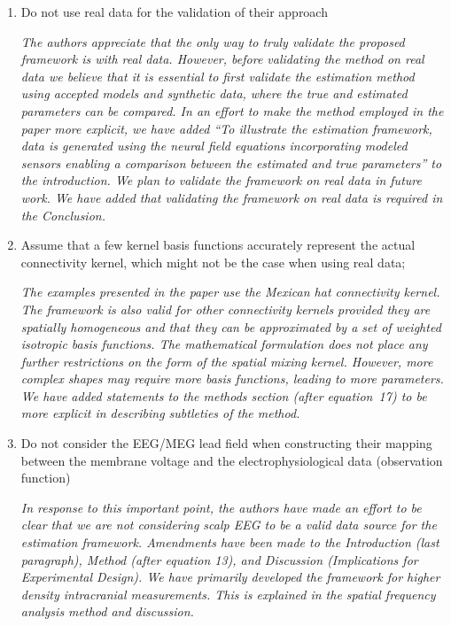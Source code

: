 \documentclass{article}
\begin{document}
    \begin{enumerate}
        \item Do not use real data for the validation of their approach

	\emph{The authors appreciate that the only way to truly validate the proposed framework is with real data. However, before validating the method on real data we believe that it is essential to first validate the estimation method using accepted models and synthetic data, where the true and estimated parameters can be compared. In an effort to make the method employed in the paper more explicit, we have added ``To illustrate the estimation framework, data is generated using the neural field equations incorporating modeled sensors enabling a comparison between the estimated and true parameters'' to the introduction. We plan to validate the framework on real data in future work. We have added that validating the framework on real data is required in the Conclusion.}
	
        \item Assume that a few kernel basis functions accurately represent the actual connectivity kernel, which might not be the case when using real data;

	\emph{The examples presented in the paper use the Mexican hat connectivity kernel. The framework is also valid for other connectivity kernels provided they are spatially homogeneous and that they can be approximated by a set of weighted isotropic basis functions. The mathematical formulation does not place any further restrictions on the form of the spatial mixing kernel. However, more complex shapes may require more basis functions, leading to more parameters. We have added statements to the methods section (after equation~17) to be more explicit in describing subtleties of the method.}

        \item Do not consider the EEG/MEG lead field when constructing their mapping between the membrane voltage and the electrophysiological data (observation function)

	\emph{In response to this important point, the authors have made an effort to be clear that we are not considering scalp EEG to be a valid data source for the estimation framework. Amendments have been made to the Introduction (last paragraph), Method (after equation 13), and Discussion (Implications for Experimental Design). We have primarily developed the framework for higher density intracranial measurements. This is explained in the spatial frequency analysis method and discussion.}
	
    \end{enumerate}
    
\end{document}
